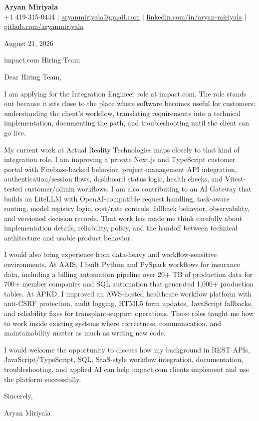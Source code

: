 \documentclass[letterpaper,11pt]{article}
\begin{document}
\begin{center}
  {\Large \textbf{Aryan Miriyala}}\\
  \small
  +1 419-315-0444 $|$
  \href{mailto:aryanmiriyala@gmail.com}{aryanmiriyala@gmail.com} $|$
  \href{https://www.linkedin.com/in/aryan-miriyala-7788a21b6/}{linkedin.com/in/aryan-miriyala} $|$
  \href{https://github.com/aryanmiriyala}{github.com/aryanmiriyala}
\end{center}

August 21, 2026

impact.com Hiring Team

Dear Hiring Team,

I am applying for the Integration Engineer role at impact.com. The role stands out because it sits close to the place where software becomes useful for customers: understanding the client's workflow, translating requirements into a technical implementation, documenting the path, and troubleshooting until the client can go live.

My current work at Actual Reality Technologies maps closely to that kind of integration role. I am improving a private Next.js and TypeScript customer portal with Firebase-backed behavior, project-management API integration, authentication/session flows, dashboard status logic, health checks, and Vitest-tested customer/admin workflows. I am also contributing to an AI Gateway that builds on LiteLLM with OpenAI-compatible request handling, task-aware routing, model registry logic, cost/rate controls, fallback behavior, observability, and versioned decision records. That work has made me think carefully about implementation details, reliability, policy, and the handoff between technical architecture and usable product behavior.

I would also bring experience from data-heavy and workflow-sensitive environments. At AAIS, I built Python and PySpark workflows for insurance data, including a billing automation pipeline over 20+ TB of production data for 700+ member companies and SQL automation that generated 1,000+ production tables. At APKD, I improved an AWS-hosted healthcare workflow platform with anti-CSRF protection, audit logging, HTML5 form updates, JavaScript fallbacks, and reliability fixes for transplant-support operations. Those roles taught me how to work inside existing systems where correctness, communication, and maintainability matter as much as writing new code.

I would welcome the opportunity to discuss how my background in REST APIs, JavaScript/TypeScript, SQL, SaaS-style workflow integration, documentation, troubleshooting, and applied AI can help impact.com clients implement and use the platform successfully.

Sincerely,

Aryan Miriyala
\end{document}
